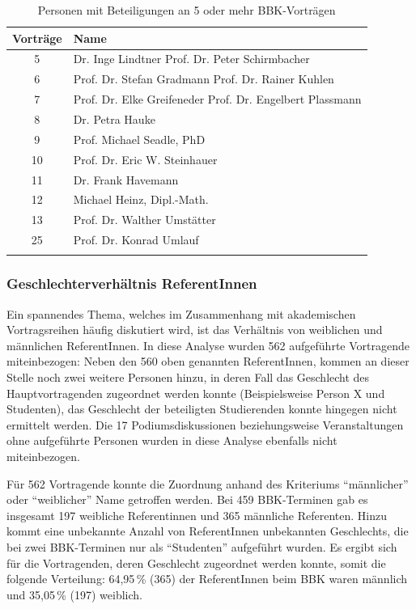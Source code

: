 \documentclass[a4paper,
fontsize=11pt,
oneside,
numbers=noperiodatend,
parskip=half-,
bibliography=totoc,
final
]{scrartcl}
\begin{document}
\begin{longtable}[]{@{}cp{5.5cm}@{}}
\toprule
\textbf{Vorträge} & \textbf{Name} \\
\midrule
5 & Dr. Inge Lindtner \newline Prof. Dr. Peter Schirmbacher \\
\midrule
6 & Prof. Dr. Stefan Gradmann \newline Prof. Dr. Rainer Kuhlen \\
\midrule
7 & Prof. Dr. Elke Greifeneder \newline Prof. Dr. Engelbert Plassmann \\
\midrule
8 & Dr. Petra Hauke \\
\midrule
9 & Prof. Michael Seadle, PhD \\
\midrule
10 & Prof. Dr. Eric W. Steinhauer \\
\midrule
11 & Dr. Frank Havemann \\
\midrule 
12 & Michael Heinz, Dipl.-Math. \\
\midrule
13 & Prof. Dr. Walther Umstätter \\
\midrule
25 & Prof. Dr. Konrad Umlauf \\
\bottomrule
\caption{Personen mit Beteiligungen an 5 oder mehr BBK-Vorträgen}
\end{longtable}

\hypertarget{geschlechterverhuxe4ltnis-referentinnen}{%
\subsubsection{Geschlechterverhältnis
ReferentInnen}\label{geschlechterverhuxe4ltnis-referentinnen}}

Ein spannendes Thema, welches im Zusammenhang mit akademischen
Vortragsreihen häufig diskutiert wird, ist das Verhältnis von weiblichen
und männlichen ReferentInnen. In diese Analyse wurden 562 aufgeführte
Vortragende miteinbezogen: Neben den 560 oben genannten ReferentInnen,
kommen an dieser Stelle noch zwei weitere Personen hinzu, in deren Fall
das Geschlecht des Hauptvortragenden zugeordnet werden konnte
(Beispielsweise Person X und Studenten), das Geschlecht der beteiligten
Studierenden konnte hingegen nicht ermittelt werden. Die 17
Podiumsdiskussionen beziehungsweise Veranstaltungen ohne aufgeführte
Personen wurden in diese Analyse ebenfalls nicht miteinbezogen.

Für 562 Vortragende konnte die Zuordnung anhand des Kriteriums
\enquote{männlicher} oder \enquote{weiblicher} Name getroffen werden.
Bei 459 BBK-Terminen gab es insgesamt 197 weibliche Referentinnen und
365 männliche Referenten. Hinzu kommt eine unbekannte Anzahl von
ReferentInnen unbekannten Geschlechts, die bei zwei BBK-Terminen nur als
\enquote{Studenten} aufgeführt wurden. Es ergibt sich für die
Vortragenden, deren Geschlecht zugeordnet werden konnte, somit die
folgende Verteilung: 64,95\,\% (365) der ReferentInnen beim BBK waren
männlich und 35,05\,\% (197) weiblich.
\end{document}
